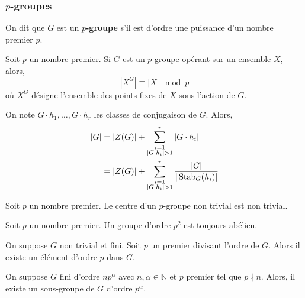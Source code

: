   \subsubsection{\texorpdfstring{$p$}{p}-groupes}


  \begin{definition}
    On dit que $G$ est un \textbf{$p$-groupe} s'il est d'ordre une puissance d'un nombre premier $p$.
  \end{definition}

  \begin{proposition}
    Soit $p$ un nombre premier. Si $G$ est un $p$-groupe opérant sur un ensemble $X$, alors,
    \[ |X^G| \equiv |X| \mod p \]
    où $X^G$ désigne l'ensemble des points fixes de $X$ sous l'action de $G$.
  \end{proposition}

  \begin{corollary}
    On note $G \cdot h_1, \dots, G \cdot h_r$ les classes de conjugaison de $G$. Alors,
    \begin{align*}
      \vert G \vert &= \vert Z(G) \vert + \sum_{\substack{i=1 \\ \vert G \cdot h_i \vert > 1}}^{r} \vert G \cdot h_i \vert \\
      &= \vert Z(G) \vert + \sum_{\substack{i=1 \\ \vert G \cdot h_i \vert > 1}}^{r} \frac{\vert G \vert}{\vert \operatorname{Stab}_G(h_i) \vert}
    \end{align*}
  \end{corollary}

  \begin{corollary}
    Soit $p$ un nombre premier. Le centre d'un $p$-groupe non trivial est non trivial.
  \end{corollary}

  \begin{corollary}
    Soit $p$ un nombre premier. Un groupe d'ordre $p^2$ est toujours abélien.
  \end{corollary}

  \begin{application}
    On suppose $G$ non trivial et fini. Soit $p$ un premier divisant l'ordre de $G$. Alors il existe un élément d'ordre $p$ dans $G$.
  \end{application}


  \begin{application}
    On suppose $G$ fini d'ordre $n p^\alpha$ avec $n, \alpha \in \mathbb{N}$ et $p$ premier tel que $p \nmid n$. Alors, il existe un sous-groupe de $G$ d’ordre $p^\alpha$.
  \end{application}

